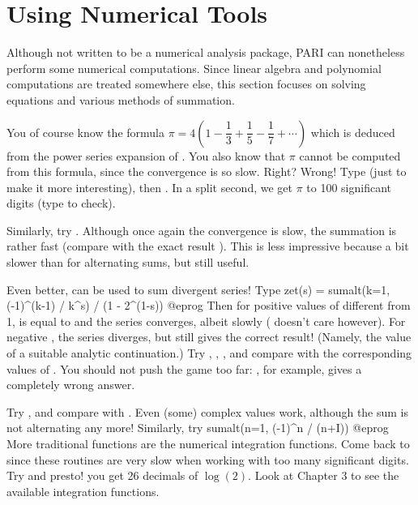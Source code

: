 \section{Using Numerical Tools}

 Although not written to be a numerical analysis package, PARI can
nonetheless perform some numerical computations. Since linear algebra and
polynomial computations are treated somewhere else, this section focuses on
solving equations and various methods of summation.

You of course know the formula $\pi = 4(1-\dfrac13+\dfrac15-\dfrac17+\cdots)$
which is deduced from the power series expansion of . You also
know that $\pi$ cannot be computed from this formula, since the convergence
is so slow. Right? Wrong! Type  (just to make it more
interesting), then . In a split
second, we get $\pi$ to 100 significant digits (type  to check).

Similarly, try . Although once again the
convergence is slow, the summation is rather fast (compare with the exact
result ). This is less impressive because a bit slower than
for alternating sums, but still useful.

Even better,  can be used to sum divergent series! Type
\bprog
  zet(s) = sumalt(k=1, (-1)^(k-1) / k^s) / (1 - 2^(1-s))
@eprog\noindent
Then for positive values of  different from 1,  is equal
to  and the series converges, albeit slowly (
doesn't care however). For negative , the series diverges, but
 still gives the correct result! (Namely, the value of a suitable
analytic continuation.) Try , , ,
and compare with the corresponding values of . You should not push
the game too far: , for example, gives a completely wrong
answer.

Try , and compare with . Even (some) complex values
work, although the sum is not alternating any more! Similarly, try
\bprog
  sumalt(n=1, (-1)^n / (n+I))
@eprog
\medskip
More traditional functions are the numerical integration functions.
Come back to  since these routines are very slow when working
with too many significant digits. Try 
and presto! you get 26 decimals of $\log(2)$. Look at Chapter 3 to see the
available integration functions.

